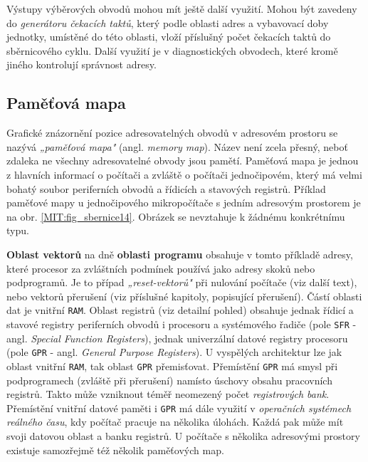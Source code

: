       Výstupy výběrových obvodů mohou mít ještě další využití. Mohou být zavedeny do 
      \emph{generátoru čekacích taktů}, který podle oblasti adres a vybavovací doby jednotky, 
      umístěné do této oblasti, vloží příslušný počet čekacích taktů do sběrnicového cyklu. Další 
      využití je v diagnostických obvodech, které kromě jiného kontrolují správnost adresy.
    
    \subsection{Paměťová mapa}
      Grafické znázornění pozice adresovatelných obvodů v adresovém prostoru se nazývá 
      \emph{„paměťová mapa"} (angl. \emph{memory map}). Název není zcela přesný, neboť zdaleka ne 
      všechny adresovatelné obvody jsou pamětí. Paměťová mapa je jednou z hlavních informací o 
      počítači a zvláště o počítači jednočipovém, který má velmi bohatý soubor periferních obvodů a 
      řídicích a stavových registrů. Příklad paměťové mapy u jednočipového mikropočítače s jedním 
      adresovým prostorem je na obr. \ref{MIT:fig_sbernice14}. Obrázek se nevztahuje k žádnému 
      konkrétnímu typu.
      
      \textbf{Oblast vektorů} na dně \textbf{oblasti programu} obsahuje v tomto příkladě adresy, 
      které procesor za zvláštních podmínek používá jako adresy skoků nebo podprogramů. Je to 
      případ \emph{„reset-vektorů"} při nulování počítače (viz další text), nebo vektorů přerušení 
      (viz příslušné kapitoly, popisující přerušení). Částí oblasti dat je vnitřní \texttt{RAM}. 
      Oblast registrů (viz detailní pohled) obsahuje jednak řídicí a stavové registry periferních 
      obvodů i procesoru a systémového řadiče (pole \texttt{SFR} - angl. \emph{Special Function 
      Registers}), jednak univerzální datové registry procesoru (pole \texttt{GPR} - angl. 
      \emph{General Purpose Registers}). U vyspělých architektur lze jak oblast vnitřní 
      \texttt{RAM}, tak oblast \texttt{GPR} přemisťovat. Přemístění \texttt{GPR} má smysl při 
      podprogramech (zvláště při přerušení) namísto úschovy obsahu pracovních registrů. Takto může 
      vzniknout téměř neomezený počet \emph{registrových bank}. Přemístění vnitřní datové paměti i 
      \texttt{GPR} má dále využití v \emph{operačních systémech reálného času}, kdy počítač 
      pracuje na několika úlohách. Každá pak může mít svoji datovou oblast a banku registrů. U 
      počítače s několika adresovými prostory existuje samozřejmě též několik paměťových map.
      
